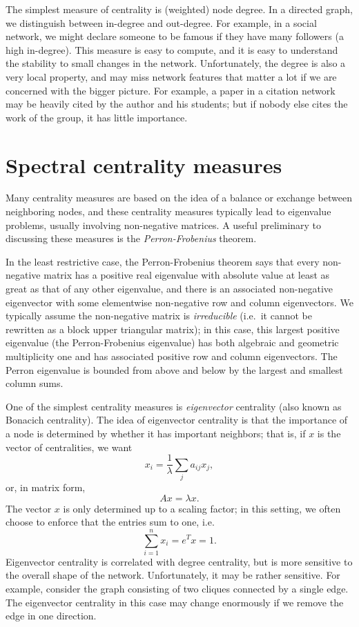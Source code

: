 \documentclass[12pt, leqno]{article} %
\begin{document}
The simplest measure of centrality is (weighted) node degree.  In a
directed graph, we distinguish between in-degree and out-degree.
For example, in a social network, we might declare someone to be
famous if they have many followers (a high in-degree).  This measure
is easy to compute, and it is easy to understand the stability to
small changes in the network.  Unfortunately, the degree is also a
very local property, and may miss network features that matter a lot
if we are concerned with the bigger picture.  For example, a paper in
a citation network may be heavily cited by the author and his
students; but if nobody else cites the work of the group, it has
little importance.

\section{Spectral centrality measures}

Many centrality measures are based on the idea of a balance or
exchange between neighboring nodes, and these centrality measures
typically lead to eigenvalue problems, usually involving non-negative
matrices.  A useful preliminary to discussing these measures is the
{\em Perron-Frobenius} theorem.

In the least restrictive case, the Perron-Frobenius theorem says that
every non-negative matrix has a positive real eigenvalue with absolute
value at least as great as that of any other eigenvalue, and there is
an associated non-negative eigenvector with some elementwise
non-negative row and column eigenvectors.  We typically assume the
non-negative matrix is {\em irreducible} (i.e.~it cannot be rewritten
as a block upper triangular matrix); in this case, this largest
positive eigenvalue (the Perron-Frobenius eigenvalue) has both
algebraic and geometric multiplicity one and has associated positive
row and column eigenvectors.  The Perron eigenvalue is bounded from
above and below by the largest and smallest column sums.

One of the simplest centrality measures is {\em eigenvector}
centrality (also known as Bonacich centrality).
The idea of eigenvector centrality is that the importance
of a node is determined by whether it has important neighbors; that
is, if $x$ is the vector of centralities, we want
\[
  x_i = \frac{1}{\lambda} \sum_j a_{ij} x_j,
\]
or, in matrix form,
\[
  Ax = \lambda x.
\]
The vector $x$ is only determined up to a scaling factor; in this
setting, we often choose to enforce that the entries sum to one, i.e.
\[
  \sum_{i=1}^n x_i = e^T x = 1.
\]
Eigenvector centrality is correlated with degree centrality, but is
more sensitive to the overall shape of the network.  Unfortunately, it
may be rather sensitive.  For example, consider the graph consisting
of two cliques connected by a single edge.  The eigenvector centrality
in this case may change enormously if we remove the edge in one direction.
\end{document}
